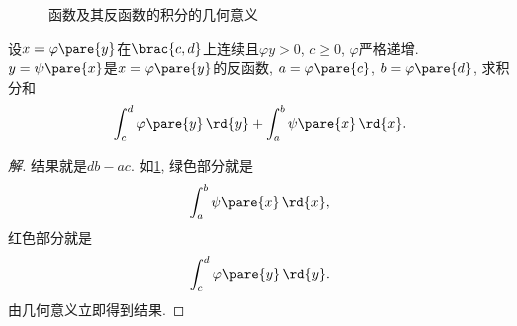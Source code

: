 \documentclass{ctexart}
\begin{document}
\begin{figure}
    \centering
    \caption{函数及其反函数的积分的几何意义}
    \label{fig:函数及其反函数的积分的几何意义}
\end{figure}
\begin{ex}
    设$x = \varphi\pare{y}$在$\brac{c,d}$上连续且$\varphi{y} > 0$, $c\ge 0$, $\varphi$严格递增. $y = \psi\pare{x}$是$x = \varphi\pare{y}$的反函数, $a = \varphi\pare{c}$, $b = \varphi\pare{d}$, 求积分和
    \[ \int_c^d \varphi\pare{y}\,\rd{y} + \int_a^b \psi\pare{x}\,\rd{x}. \]
\end{ex}
\begin{proof}[解]
    结果就是$db-ac$. 如\cref{fig:函数及其反函数的积分的几何意义}, 绿色部分就是
    \[ \int_a^b \psi\pare{x}\,\rd{x}, \]
    红色部分就是
    \[ \int_c^d \varphi\pare{y}\,\rd{y}. \]
    由几何意义立即得到结果.
\end{proof}
\end{document}
